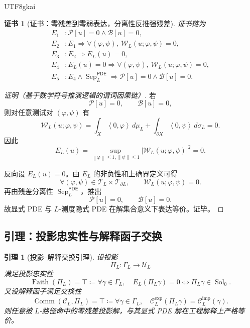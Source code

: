 \documentclass[12pt]{article}
\newtheorem{lemma}{引理}[section]
\newtheorem{Certificate}{证书}[section]
\newcommand{\DefEq}{\coloneqq}
\newcommand{\Pcal}{\mathcal P}
\newcommand{\Bcal}{\mathcal B}
\newcommand{\Ucal}{\mathcal U}
\newcommand{\PDE}{\ensuremath{\mathsf{PDE}}}
\newcommand{\norm}[1]{\left\lVert #1 \right\rVert}
\newcommand{\ip}[2]{\left\langle #1,#2 \right\rangle}
\DeclareMathOperator{\Sol}{Sol}
\DeclareMathOperator{\Sep}{Sep}
\DeclareMathOperator{\Faith}{Faith}
\DeclareMathOperator{\Comm}{Comm}
\begin{document}
\begin{CJK*}{UTF8}{gkai}
\begin{Certificate}[证书：零残差到零弱表达，分离性反推强残差]
\label{cert:tex58-explicit-implicit-expression-equivalence}
证书链为
\[
\begin{aligned}
  E_1 &: \Pcal[u]=0\wedge\Bcal[u]=0,\\
  E_2 &: E_1\Rightarrow
  \forall(\varphi,\psi),\ \mathcal W_L(u;\varphi,\psi)=0,\\
  E_3 &: E_2\Rightarrow E_L(u)=0,\\
  E_4 &: E_L(u)=0\Rightarrow
  \forall(\varphi,\psi),\ \mathcal W_L(u;\varphi,\psi)=0,\\
  E_5 &: E_4\wedge\Sep_L^{\PDE}
  \Rightarrow \Pcal[u]=0\wedge\Bcal[u]=0.
\end{aligned}
\]
\end{Certificate}

\begin{proof}[证明（基于数学符号推演逻辑的谓词因果链）]
若
\[
  \Pcal[u]=0,
  \qquad
  \Bcal[u]=0,
\]
则对任意测试对 \((\varphi,\psi)\) 有
\[
  \mathcal W_L(u;\varphi,\psi)
  =
  \int_X\ip{0}{\varphi}\,d\mu_L
  +
  \int_{\partial X}\ip{0}{\psi}\,d\sigma_L
  =
  0.
\]
因此
\[
  E_L(u)
  =
  \sup_{\norm{\varphi}\le1,\norm{\psi}\le1}
  |\mathcal W_L(u;\varphi,\psi)|^2
  =
  0.
\]

反向设 \(E_L(u)=0\)。由 \(E_L\) 的非负性和上确界定义可得
\[
  \forall(\varphi,\psi)\in\mathcal T_L\times\mathcal T_{\partial L},
  \qquad
  \mathcal W_L(u;\varphi,\psi)=0.
\]
再由残差分离性 \(\Sep_L^{\PDE}\)，推出
\[
  \Pcal[u]=0,
  \qquad
  \Bcal[u]=0.
\]
故显式 PDE 与 \(L\)-测度隐式 PDE 在解集合意义下表达等价。证毕。
\end{proof}

\subsection{引理：投影忠实性与解释函子交换}
\label{subsec:tex58-projection-commutation-lemma}

\begin{lemma}[投影--解释交换引理]
\label{lem:tex58-projection-interpretation-commutation}
设投影
\[
  \Pi_L:\Gamma_L\to\Ucal_L
\]
满足投影忠实性
\[
  \Faith(\Pi_L)=\top
  \DefEq
  \forall\gamma\in\Gamma_L,\quad
  E_L(\Pi_L\gamma)=0
  \Longleftrightarrow
  \Pi_L\gamma\in\Sol_0.
\]
又设解释函子满足交换性
\[
  \Comm(\mathcal C_L,\Pi_L)=\top
  \DefEq
  \forall\gamma\in\Gamma_L,\quad
  \mathcal C_L^{\mathrm{exp}}(\Pi_L\gamma)
  =
  \mathcal C_L^{\mathrm{imp}}(\gamma).
\]
则任意被 \(L\)-路径命中的零残差投影解，与其显式 PDE 解在工程解释上严格等价。
\end{lemma}


\end{CJK*}
\end{document}
